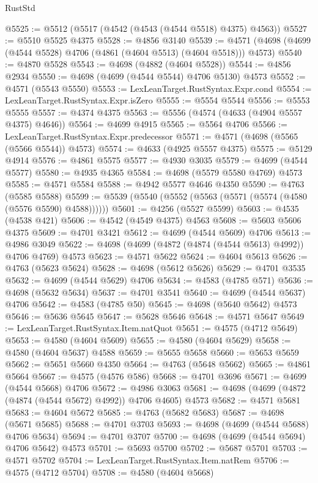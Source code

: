 \begin{lexlean}{RustStd}
\begin{coremodule}
@5525 := @5512 (@5517 (@4542 (@4543 (@4544 @5518) @4375) @4563))
@5527 := @5510 @5525 @4375
@5528 := @4856 @3140
@5539 := @4571 (@4698 (@4699 (@4544 @5528) @4706 (@4861 (@4604 @5513) (@4604 @5518))) @4573)
@5540 := @4870 @5528
@5543 := @4698 (@4882 (@4604 @5528))
@5544 := @4856 @2934
@5550 := @4698 (@4699 (@4544 @5544) @4706 @5130) @4573
@5552 := @4571 (@5543 @5550)
@5553 := LexLeanTarget.RustSyntax.Expr.cond
@5554 := LexLeanTarget.RustSyntax.Expr.isZero
@5555 := @5554 @5544
@5556 := @5553 @5555
@5557 := @4374 @4375
@5563 := @5556 (@4574 (@4633 (@4904 @5557 @4375) @4646))
@5564 := @4699 @4915
@5565 := @5564 @4706
@5566 := LexLeanTarget.RustSyntax.Expr.predecessor
@5571 := @4571 (@4698 (@5565 (@5566 @5544)) @4573)
@5574 := @4633 (@4925 @5557 @4375)
@5575 := @5129 @4914
@5576 := @4861 @5575
@5577 := @4930 @3035
@5579 := @4699 (@4544 @5577)
@5580 := @4935 @4365
@5584 := @4698 (@5579 @5580 @4769) @4573
@5585 := @4571 @5584
@5588 := @4942 @5577 @4646 @4350
@5590 := @4763 (@5585 @5588)
@5599 := @5539 (@5540 (@5552 (@5563 (@5571 (@5574 (@4580 (@5576 @5590) @4588))))))
@5601 := @4256 (@5527 @5599)
@5603 := @4535 (@4538 @421)
@5606 := @4542 (@4549 @4375) @4563
@5608 := @5603 @5606 @4375
@5609 := @4701 @3421
@5612 := @4699 (@4544 @5609) @4706
@5613 := @4986 @3049
@5622 := @4698 (@4699 (@4872 (@4874 (@4544 @5613) @4992)) @4706 @4769) @4573
@5623 := @4571 @5622
@5624 := @4604 @5613
@5626 := @4763 (@5623 @5624)
@5628 := @4698 (@5612 @5626)
@5629 := @4701 @3535
@5632 := @4699 (@4544 @5629) @4706
@5634 := @4583 (@4785 @571)
@5636 := @4698 (@5632 @5634)
@5637 := @4701 @3541
@5640 := @4699 (@4544 @5637) @4706
@5642 := @4583 (@4785 @50)
@5645 := @4698 (@5640 @5642) @4573
@5646 := @5636 @5645
@5647 := @5628 @5646
@5648 := @4571 @5647
@5649 := LexLeanTarget.RustSyntax.Item.natQuot
@5651 := @4575 (@4712 @5649)
@5653 := @4580 (@4604 @5609)
@5655 := @4580 (@4604 @5629)
@5658 := @4580 (@4604 @5637) @4588
@5659 := @5655 @5658
@5660 := @5653 @5659
@5662 := @5651 @5660 @4350
@5664 := @4763 (@5648 @5662)
@5665 := @4861 @5664
@5667 := @4575 (@4576 @586)
@5668 := @4701 @3696
@5671 := @4699 (@4544 @5668) @4706
@5672 := @4986 @3063
@5681 := @4698 (@4699 (@4872 (@4874 (@4544 @5672) @4992)) @4706 @4605) @4573
@5682 := @4571 @5681
@5683 := @4604 @5672
@5685 := @4763 (@5682 @5683)
@5687 := @4698 (@5671 @5685)
@5688 := @4701 @3703
@5693 := @4698 (@4699 (@4544 @5688) @4706 @5634)
@5694 := @4701 @3707
@5700 := @4698 (@4699 (@4544 @5694) @4706 @5642) @4573
@5701 := @5693 @5700
@5702 := @5687 @5701
@5703 := @4571 @5702
@5704 := LexLeanTarget.RustSyntax.Item.natRem
@5706 := @4575 (@4712 @5704)
@5708 := @4580 (@4604 @5668)

\end{coremodule}
\end{lexlean}
